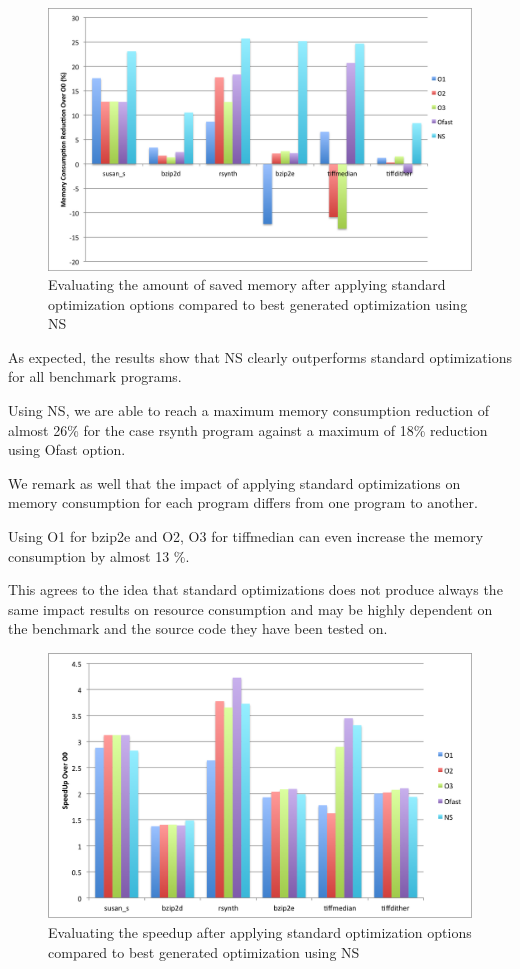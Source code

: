 \begin{figure}[!ht]
	\centering
	\includegraphics[width=1.\linewidth]{chapitre4/fig/infra_novelty_stat3.png}
	\caption{Evaluating the amount of saved memory after applying standard optimization options compared to best generated optimization using NS}
\end{figure}


As expected, the results show that NS clearly outperforms standard optimizations for all benchmark programs. 

Using NS, we are able to reach a maximum memory consumption reduction of almost 26\% for the case rsynth program against a maximum of 18\% reduction using Ofast option.

We remark as well that the impact of applying standard optimizations on memory consumption for each program differs from one program to another. 

Using O1 for bzip2e and O2, O3 for tiffmedian can even increase the memory consumption by almost 13 \%. 

This agrees to the idea that standard optimizations does not produce always the same impact results on resource consumption and may be highly dependent on the benchmark and the source code they have been tested on. 

\begin{figure}[!ht]
	\centering
	\includegraphics[width=1.\linewidth]{chapitre4/fig/infra_novelty_stat2.png}
	\caption{Evaluating the speedup after applying standard optimization options compared to best generated optimization using NS}
\end{figure}

